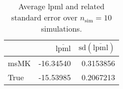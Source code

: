 \begin{table}[H]

\caption{Average lpml and related standard error over $n_{\text{sim}} = 10$ simulations.}
\centering
\begin{tabular}[t]{lrr}
\toprule
  & $\overbar{\text{lpml}}$ & $\text{sd}(\overbar{\text{lpml}})$\\
\midrule
msMK & -16.34540 & 0.3153856\\
True & -15.53985 & 0.2067213\\
\bottomrule
\end{tabular}
\end{table}